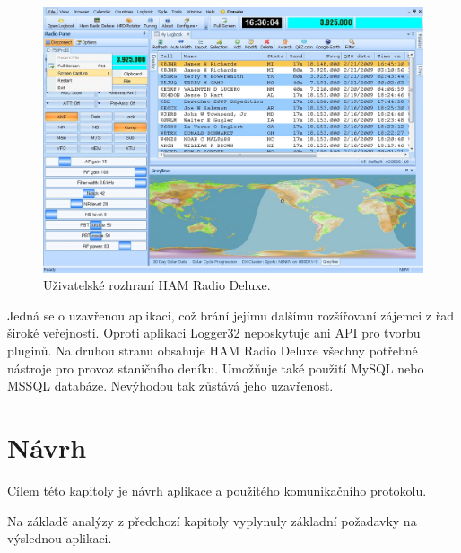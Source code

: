 \begin{figure}[h]
\centering
\includegraphics[trim=0cm 0cm 0cm 0cm, scale=0.33]{fig/hrd}
\caption{Uživatelské rozhraní HAM Radio Deluxe.}
\label{fig:ham_radio_deluxe}
\end{figure}

Jedná se o uzavřenou aplikaci, což brání jejímu dalšímu rozšířovaní zájemci z
řad široké veřejnosti. Oproti aplikaci
Logger32 neposkytuje ani API pro tvorbu pluginů. Na druhou stranu obsahuje HAM Radio Deluxe všechny
potřebné nástroje pro provoz staničního deníku. Umožňuje také použití MySQL nebo MSSQL databáze.
Nevýhodou tak zůstává jeho uzavřenost.


\chapter{Návrh}
\label{navrh}

Cílem této kapitoly je návrh aplikace a použitého komunikačního protokolu.

Na základě analýzy z předchozí kapitoly vyplynuly základní požadavky
na výslednou aplikaci.

